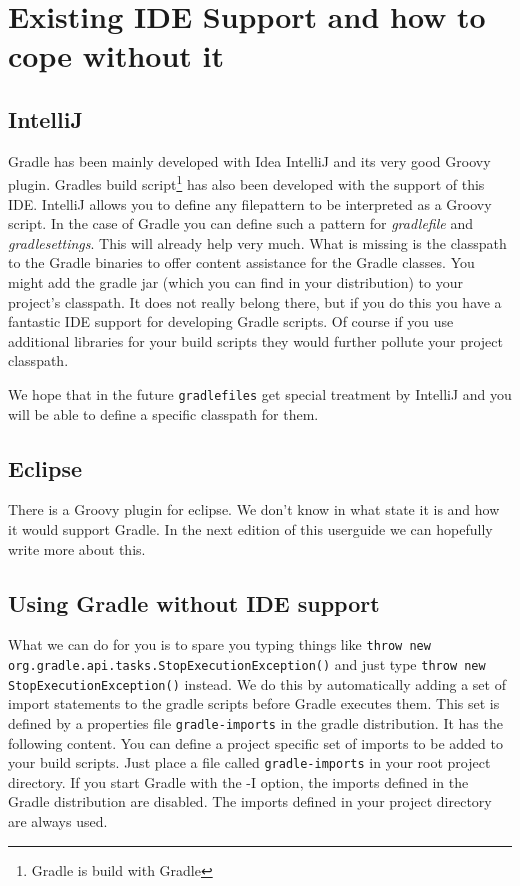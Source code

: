 \chapter{Existing IDE Support and how to cope without it} %
\label{cha:ide_support}
\section{IntelliJ} %
\label{sec:intellij}
Gradle has been mainly developed with Idea IntelliJ and its very good Groovy plugin. Gradles build script\footnote{Gradle is build with Gradle} has also been developed with the support of this IDE. IntelliJ allows you to define any filepattern to be interpreted as a Groovy script. In the case of Gradle you can define such a pattern for \emph{gradlefile} and \emph{gradlesettings}. This will already help very much. What is missing is the classpath to the Gradle binaries to offer content assistance for the Gradle classes. You might add the gradle jar (which you can find in your distribution) to your project's classpath. It does not really belong there, but if you do this you have a fantastic IDE support for developing Gradle scripts. Of course if you use additional libraries for your build scripts they would further pollute your project classpath.  

We hope that in the future \texttt{gradlefiles} get special treatment by IntelliJ and you will be able to define a specific classpath for them. 

\section{Eclipse} %
\label{sec:eclipse}
There is a Groovy plugin for eclipse. We don't know in what state it is and how it would support Gradle. In the next edition of this userguide we can hopefully write more about this.

\section{Using Gradle without IDE support} %
\label{sec:using_gradle_without_ide_support}
What we can do for you is to spare you typing things like \texttt{throw new org.gradle.api.tasks.StopExecutionException()} and just type \texttt{throw new StopExecutionException()} instead. We do this by automatically adding a set of import statements to the gradle scripts before Gradle executes them. This set is defined by a properties file \texttt{gradle-imports} in the gradle distribution. It has the following content.
You can define a project specific set of imports to be added to your build scripts. Just place a file called \texttt{gradle-imports} in your root project directory. If you start Gradle with the {-I} option, the imports defined in the Gradle distribution are disabled. The imports defined in your project directory are always used.


